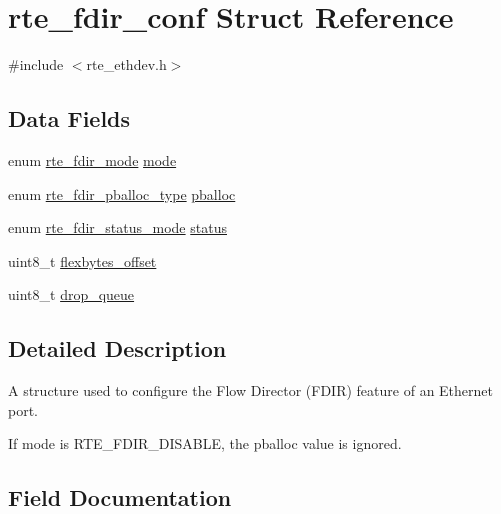 \hypertarget{structrte__fdir__conf}{}\section{rte\+\_\+fdir\+\_\+conf Struct Reference}
\label{structrte__fdir__conf}


{\ttfamily \#include $<$rte\+\_\+ethdev.\+h$>$}

\subsection*{Data Fields}
\begin{DoxyCompactItemize}
\item 
enum \hyperlink{rte__ethdev_8h_ac1f701a3e5754496d2dff0063717bd88}{rte\+\_\+fdir\+\_\+mode} \hyperlink{structrte__fdir__conf_ac232664a75e2d52a9bec4235b0896046}{mode}
\item 
enum \hyperlink{rte__ethdev_8h_a9eda431989b68c708c7a875d71592a70}{rte\+\_\+fdir\+\_\+pballoc\+\_\+type} \hyperlink{structrte__fdir__conf_a7fb17234fd998f8a09757542754e3ec7}{pballoc}
\item 
enum \hyperlink{rte__ethdev_8h_acf7335105af297398262762ce692765b}{rte\+\_\+fdir\+\_\+status\+\_\+mode} \hyperlink{structrte__fdir__conf_a6d21f48c75d50917d0b737473df8b067}{status}
\item 
uint8\+\_\+t \hyperlink{structrte__fdir__conf_ad44e0922f241056e54de2b94d1f5d9b3}{flexbytes\+\_\+offset}
\item 
uint8\+\_\+t \hyperlink{structrte__fdir__conf_a23a38b9406dcbda7a8c54adb0cb29b77}{drop\+\_\+queue}
\end{DoxyCompactItemize}


\subsection{Detailed Description}
A structure used to configure the Flow Director (F\+D\+I\+R) feature of an Ethernet port.

If mode is R\+T\+E\+\_\+\+F\+D\+I\+R\+\_\+\+D\+I\+S\+A\+B\+L\+E, the pballoc value is ignored. 

\subsection{Field Documentation}
\hypertarget{structrte__fdir__conf_a23a38b9406dcbda7a8c54adb0cb29b77}{}
